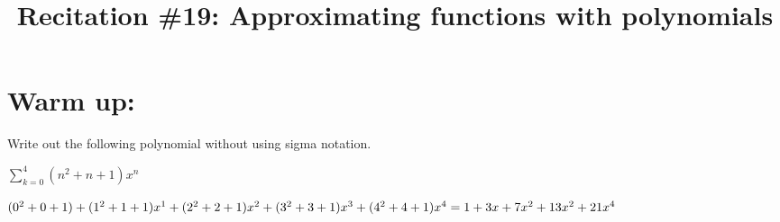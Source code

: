 \documentclass[noinstructornotes]{ximera}
\title{Recitation \#19: Approximating functions with polynomials}
\begin{document}
\begin{abstract}		\end{abstract}
\maketitle


\section{Warm up:}

Write out the following polynomial without using sigma notation.

$\sum_{k=0}^4 (n^2+n+1)x^n $

\begin{freeResponse}
$(0^2+0+1)+(1^2+1+1)x^1+(2^2+2+1)x^2+(3^2+3+1)x^3+(4^2+4+1)x^4 \\
= 1+3x+7x^2+13x^2+21x^4$
\end{freeResponse}
\end{document}
